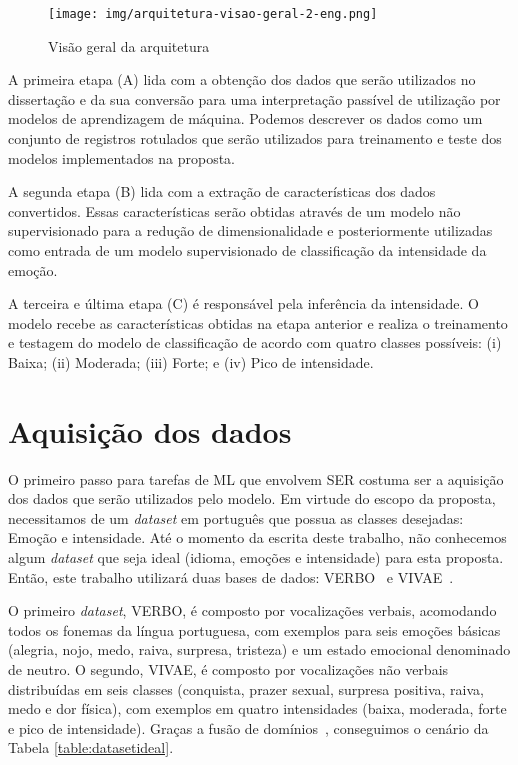 \begin{figure}[]
\centering
\texttt{[image: img/arquitetura-visao-geral-2-eng.png]}
\caption{\label{fig:visaogeralproposta}Visão geral da arquitetura}
\end{figure}

A primeira etapa (A) lida com a obtenção dos dados que serão utilizados no dissertação e da sua conversão para uma interpretação passível de utilização por modelos de aprendizagem de máquina. Podemos descrever os dados como um conjunto de registros rotulados que serão utilizados para treinamento e teste dos modelos implementados na proposta.

A segunda etapa (B) lida com a extração de características dos dados convertidos. Essas características serão obtidas através de um modelo não supervisionado para a redução de dimensionalidade e posteriormente utilizadas como entrada de um modelo supervisionado de classificação da intensidade da emoção.

A terceira e última etapa (C) é responsável pela inferência da intensidade. O modelo recebe as características obtidas na etapa anterior e realiza o treinamento e testagem do modelo de classificação de acordo com quatro classes possíveis: (i) Baixa; (ii) Moderada; (iii) Forte; e (iv) Pico de intensidade.

\section{Aquisição dos dados}

O primeiro passo para tarefas de \acrlong{ML} que envolvem \acrshort{SER} costuma ser a aquisição dos dados que serão utilizados pelo modelo. Em virtude do escopo da proposta, necessitamos de um \textit{dataset} em português que possua as classes desejadas: Emoção e intensidade. Até o momento da escrita deste trabalho, não conhecemos algum \textit{dataset} que seja ideal (idioma, emoções e intensidade) para esta proposta. Então, este trabalho utilizará duas bases de dados: VERBO~\cite{12.21} e VIVAE~\cite{16}.

O primeiro \textit{dataset}, VERBO, é composto por vocalizações verbais, acomodando todos os fonemas da língua portuguesa, com exemplos para seis emoções básicas (alegria, nojo, medo, raiva, surpresa, tristeza) e um estado emocional denominado de neutro. O segundo, VIVAE, é composto por vocalizações não verbais distribuídas em seis classes (conquista, prazer sexual, surpresa positiva, raiva, medo e dor física), com exemplos em quatro intensidades (baixa, moderada, forte e pico de intensidade). Graças a fusão de domínios~\cite{49}, conseguimos o cenário da Tabela \ref{table:datasetideal}.


